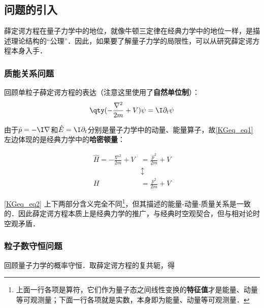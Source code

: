 


\subsection{问题的引入}

薛定谔方程在量子力学中的地位，就像牛顿三定律在经典力学中的地位一样，是描述理论结构的“公理”．因此，如果要了解量子力学的局限性，可以从研究薛定谔方程本身入手．

\subsubsection{质能关系问题}

回顾单粒子薛定谔方程的表达（注意这里使用了\textbf{自然单位制}）：
\begin{equation}\label{KGeq_eq1}
\qty(-\frac{\nabla^2}{2m}+V)\psi = \I \partial_t \psi
\end{equation}

由于$\hat{p}=-\I\nabla$和$\hat{E}=\I\partial_t$分别是量子力学中的动量、能量算子，故\autoref{KGeq_eq1} 左边体现的是经典力学中的\textbf{哈密顿量}：

\begin{equation}\label{KGeq_eq2}
\begin{aligned}
\hat{H}=-\frac{\nabla^2}{2m}+V &= \frac{\hat{p}^2}{2m}+V \\
&\updownarrow\\
H &= \frac{p^2}{2m}+V
\end{aligned}
\end{equation}

\autoref{KGeq_eq2} 上下两部分含义完全不同\footnote{上面一行各项是算符，它们作为量子态之间线性变换的\textbf{特征值}才是能量、动量等可观测量；下面一行各项就是实数，本身即为能量、动量等可观测量．}，但其描述的能量-动量-质量关系是一致的．因此薛定谔方程本质上是经典力学的推广，与经典时空观契合，但与相对论时空观矛盾．

\subsubsection{粒子数守恒问题}

回顾量子力学的概率守恒．取薛定谔方程的复共轭，得

